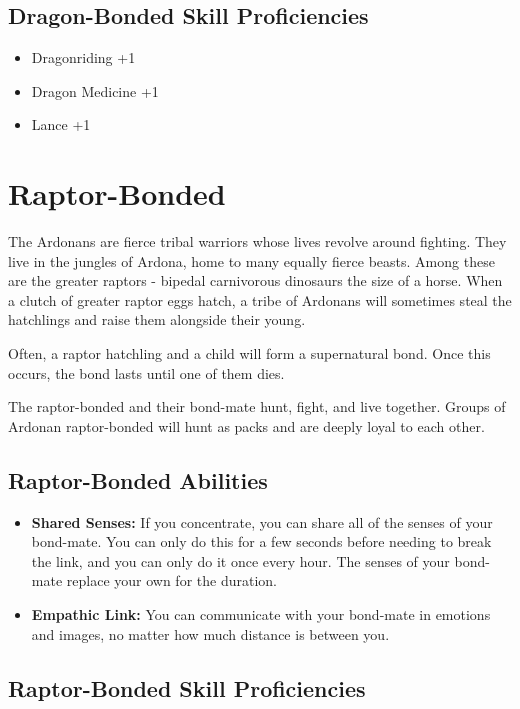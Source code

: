 \begin{multicols}{2}
\subsection{Dragon-Bonded Skill Proficiencies}

\begin{itemize}
    \item Dragonriding +1
    \item Dragon Medicine +1
    \item Lance +1
\end{itemize}

\section{Raptor-Bonded}

The Ardonans are fierce tribal warriors whose lives revolve around 
fighting. They live in the jungles of Ardona, home to many equally 
fierce beasts. Among these are the greater raptors - bipedal carnivorous 
dinosaurs the size of a horse. When a clutch of greater raptor eggs hatch, 
a tribe of Ardonans will sometimes steal the hatchlings and raise them 
alongside their young.

Often, a raptor hatchling and a child will form a supernatural bond. 
Once this occurs, the bond lasts until one of them dies.

The raptor-bonded and their bond-mate hunt, fight, and live together. 
Groups of Ardonan raptor-bonded will hunt as packs and are deeply loyal 
to each other.

\subsection{Raptor-Bonded Abilities}

\begin{itemize}
    \item \textbf{Shared Senses:} If you concentrate, you can share all 
    of the senses of your bond-mate. You can only do this for a few seconds
    before needing to break the link, and you can only do it once every hour. 
    The senses of your bond-mate replace your own for the duration.
    \item \textbf{Empathic Link:} You can communicate with your bond-mate 
    in emotions and images, no matter how much distance is between you.
\end{itemize}

\subsection{Raptor-Bonded Skill Proficiencies}


\end{multicols}

